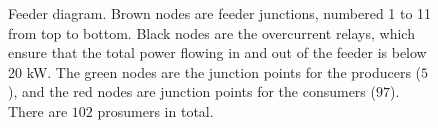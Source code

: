 \begin{figure}[t]
{
 }
 \caption{Feeder diagram. Brown nodes are feeder junctions, numbered 1 to 11 from top to bottom.  Black nodes are the overcurrent relays, which ensure that the total power flowing in and out of the feeder is below 20 kW. The green nodes are the junction points for the producers ($5$), and the red nodes are junction points for the consumers ($97$). There are $102$ prosumers in total.}
 \label{fig:feeder}
 \end{figure}

